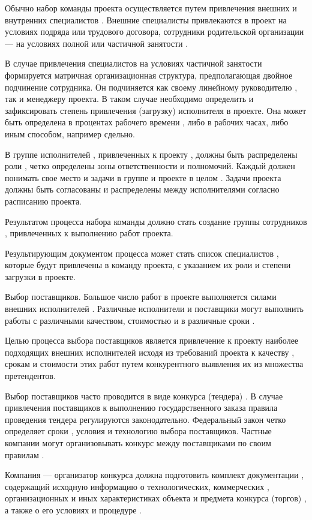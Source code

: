 Обычно набор команды проекта осуществляется путем привле­чения внешних и внутренних специалистов .
Внешние специалисты привлекаются в проект на условиях подряда или трудового догово­ра, сотрудники родительской организации --- на условиях полной или частичной занятости .

В случае привлечения специалистов на условиях частичной заня­тости формируется матричная организационная структура, предпола­гающая двойное подчинение сотрудника.
Он подчиняется как своему линейному руководителю , так и менеджеру проекта.
В таком случае необходимо определить и зафиксировать степень привлечения (за­грузку) исполнителя в проекте.
Она может быть определена в про­центах рабочего времени , либо в рабочих часах, либо иным способом, например сдельно.

В группе исполнителей , привлеченных к проекту , должны быть распределены роли , четко определены зоны ответственности и пол­номочий.
Каждый должен понимать свое место и задачи в группе и проекте в целом .
Задачи проекта должны быть согласованы и распре­делены между исполнителями согласно расписанию проекта.

Результатом процесса набора команды должно стать создание группы сотрудников , привлеченных к выполнению работ проекта.

Результирующим документом процесса может стать список специа­листов , которые будут привлечены в команду проекта, с указанием их роли и степени загрузки в проекте.

Выбор поставщиков.
Большое число работ в проекте выполняется силами внешних испол­нителей .
Различные исполнители и поставщики могут выполнить ра­боты с различными качеством, стоимостью и в различные сроки .

Целью процесса выбора поставщиков является привлечение к про­екту наиболее подходящих внешних исполнителей исходя из требований проекта к качеству , срокам и стоимости этих работ путем конку­рентного выявления их из множества претендентов.

Выбор поставщиков часто проводится в виде конкурса (тендера) .
В случае привлечения поставщиков к выполнению государственного заказа правила проведения тендера регулируются законодательно.
Федеральный закон четко определяет сроки , условия и технологию выбора поставщиков.
Частные компании могут организовывать кон­курс между поставщиками по своим правилам .

Компания --- организатор конкурса должна подготовить комплект документации , содержащий исходную информацию о технологических, коммерческих , организационных и иных характеристиках объекта и предмета конкурса (торгов) , а также о его условиях и процедуре .

